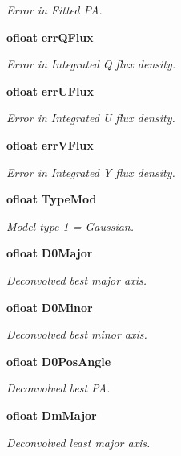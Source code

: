 \begin{CompactItemize}
\begin{CompactList}\small\item\em Error in Fitted PA. \item\end{CompactList}\item 
{\bf ofloat} {\bf err\-QFlux}
\begin{CompactList}\small\item\em Error in Integrated Q flux density. \item\end{CompactList}\item 
{\bf ofloat} {\bf err\-UFlux}
\begin{CompactList}\small\item\em Error in Integrated U flux density. \item\end{CompactList}\item 
{\bf ofloat} {\bf err\-VFlux}
\begin{CompactList}\small\item\em Error in Integrated Y flux density. \item\end{CompactList}\item 
{\bf ofloat} {\bf Type\-Mod}
\begin{CompactList}\small\item\em Model type 1 = Gaussian. \item\end{CompactList}\item 
{\bf ofloat} {\bf D0Major}
\begin{CompactList}\small\item\em Deconvolved best major axis. \item\end{CompactList}\item 
{\bf ofloat} {\bf D0Minor}
\begin{CompactList}\small\item\em Deconvolved best minor axis. \item\end{CompactList}\item 
{\bf ofloat} {\bf D0Pos\-Angle}
\begin{CompactList}\small\item\em Deconvolved best PA. \item\end{CompactList}\item 
{\bf ofloat} {\bf Dm\-Major}
\begin{CompactList}\small\item\em Deconvolved least major axis. \item\end{CompactList}\item 

\end{CompactItemize}
